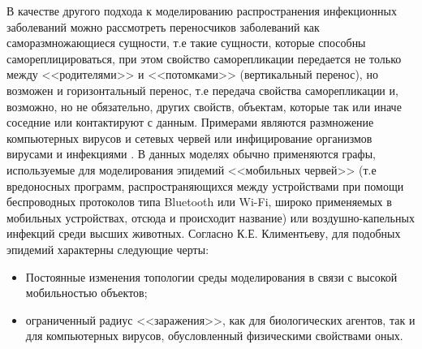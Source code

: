 В качестве другого подхода к моделированию распространения инфекционных заболеваний можно рассмотреть переносчиков заболеваний как  саморазмножающиеся сущности, т.е такие сущности, которые способны самореплицироваться, при этом свойство  саморепликации передается не только между <<родителями>> и <<потомками>> (вертикальный перенос), но возможен и горизонтальный перенос, т.е передача свойства саморепликации и, возможно, но не обязательно, других свойств, объектам, которые так или иначе соседние или контактируют с данным.  Примерами являются размножение компьютерных вирусов и сетевых червей  %
 или инфицирование организмов вирусами и инфекциями %
. 
В данных моделях обычно применяются графы, используемые для моделирования эпидемий <<мобильных червей>> (т.е вредоносных программ, распространяющихся между устройствами при помощи беспроводных протоколов типа Bluetooth или Wi-Fi, широко применяемых в мобильных устройствах, отсюда и происходит название) %
или воздушно-капельных инфекций среди высших  животных.   %
Согласно К.Е. Климентьеву, %
для подобных эпидемий характерны следующие черты:
\begin{itemize}
	\item Постоянные изменения топологии среды моделирования в связи с высокой мобильностью  объектов;
	\item ограниченный радиус <<заражения>>, как для биологических агентов, так и для компьютерных вирусов, обусловленный физическими свойствами оных.
\end{itemize}


